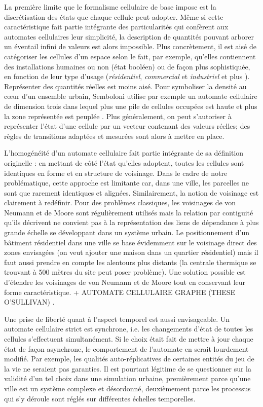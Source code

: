 \documentclass[10pt]{article}
\begin{document}
\begin{multicols}{2}
La première limite que le formalisme cellulaire de base impose est la
discrétisation des états que chaque cellule peut adopter. Même si
cette caractéristique fait partie intégrante des particularités qui
confèrent aux automates cellulaires leur simplicité, la description de
quantités pouvant arborer un éventail infini de valeurs est alors
impossible. Plus concrètement, il est aisé de catégoriser les cellules
d'un espace selon le fait, par exemple, qu'elles contiennent des
installations humaines ou non (état booléen)
\cite{Benguigui2004,Cornu} ou de façon plus sophistiquée, en fonction
de leur type d'usage (\textit{résidentiel}, \textit{commercial} et
\textit{industriel} \cite{Lechner} et plus
\cite{Dubos-Paillard203}). Représenter des quantités réelles est moins
aisé. Pour symboliser la densité au c\oe ur d'un ensemble urbain,
Semboloni utilise par exemple un automate cellulaire de dimension
trois dans lequel plus une pile de cellules occupées est haute et plus
la zone représentée est peuplée \cite{Semboloni2000}. Plus
généralement, on peut s'autoriser à représenter l'état d'une cellule
par un vecteur contenant des valeurs réelles; des règles de
transitions adaptées et mesurées sont alors à mettre en place.

L'homogénéité d'un automate cellulaire fait partie intégrante de sa
définition originelle : en mettant de côté l'état qu'elles adoptent,
toutes les cellules sont identiques en forme et en structure de
voisinage. Dans le cadre de notre problématique, cette approche est
limitante car, dans une ville, les parcelles ne sont que rarement
identiques et alignées. Similairement, la notion de voisinage est
clairement à redéfinir. Pour des problèmes classiques, les voisinages
de von Neumann et de Moore sont régulièrement utilisés mais la
relation par contiguité qu'ils décrivent ne convient pas à la
représentation des liens de dépendance à plus grande échelle se
développant dans un système urbain. Le positionnement d'un bâtiment
résidentiel dans une ville se base évidemment sur le voisinage direct
des zones envisagées (on veut ajouter une maison dans un quartier
résidentiel) mais il faut aussi prendre en compte les alentours plus
distants (la centrale thermique se trouvant à 500 mètres du site peut
poser problème). Une solution possible est d'étendre les voisinages de
von Neumann et de Moore tout en conservant leur forme
caractéristique. + AUTOMATE CELLULAIRE GRAPHE (THESE O'SULLIVAN)
\cite{O'Sullivan2000,0'Sullivan2001}.

Une prise de liberté quant à l'aspect temporel est aussi
envisageable. Un automate cellulaire strict est synchrone, i.e. les
changements d'état de toutes les cellules s'effectuent
simultanément. Si le choix était fait de mettre à jour chaque état de
façon asynchrone, le comportement de l'automate en serait lourdement
modifié. Par exemple, les qualités auto-réplicatives de certaines
entités du jeu de la vie ne seraient pas garanties. Il est pourtant
légitime de se questionner sur la validité d'un tel choix dans une
simulation urbaine, premièrement parce qu'une ville est un système
complexe et désordonné, deuxièmement parce les processus qui s'y
déroule sont réglés sur différentes échelles temporelles.


\end{multicols}
\end{document}
